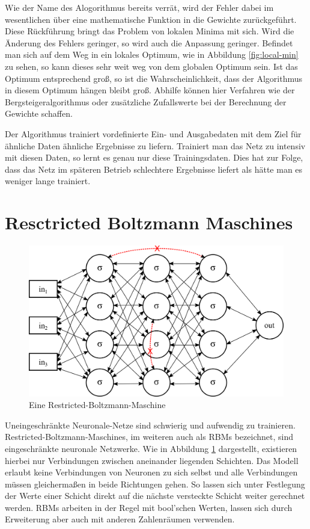 Wie der Name des Alogorithmus bereits verrät, wird der Fehler dabei im wesentlichen über eine mathematische Funktion in die Gewichte zurückgeführt. Diese Rückführung bringt das Problem von lokalen Minima mit sich. Wird die Änderung des Fehlers geringer, so wird auch die Anpassung geringer. Befindet man sich auf dem Weg in ein lokales Optimum, wie in Abbildung \ref{fig:local-min} zu sehen, so kann dieses sehr weit weg von dem globalen Optimum sein. Ist das Optimum entsprechend groß, so ist die Wahrscheinlichkeit, dass der Algorithmus in diesem Optimum hängen bleibt groß. Abhilfe können hier Verfahren wie der Bergsteigeralgorithmus oder zusätzliche Zufallswerte bei der Berechnung der Gewichte schaffen.

Der Algorithmus trainiert vordefinierte Ein- und Ausgabedaten mit dem Ziel für ähnliche Daten ähnliche Ergebnisse zu liefern. Trainiert man das Netz zu intensiv mit diesen Daten, so lernt es genau nur diese Trainingsdaten. Dies hat zur Folge, dass das Netz im späteren Betrieb schlechtere Ergebnisse liefert als hätte man es weniger lange trainiert.

\section{Resctricted Boltzmann Maschines}

\begin{figure}
	\centering
	\includegraphics[scale=1]{images/rbm.png}
	\caption{Eine Restricted-Boltzmann-Maschine}
	\label{fig:rbm}
\end{figure}

Uneingeschränkte Neuronale-Netze sind schwierig und aufwendig zu trainieren. Restricted-Boltzmann-Maschines, im weiteren auch als RBMs bezeichnet, sind eingeschränkte neuronale Netzwerke. Wie in Abbildung \ref{fig:rbm} dargestellt, existieren hierbei nur Verbindungen zwischen aneinander liegenden Schichten. Das Modell erlaubt keine Verbindungen von Neuronen zu sich selbst und alle Verbindungen müssen gleichermaßen in beide Richtungen gehen. So lassen sich unter Festlegung der Werte einer Schicht direkt auf die nächste versteckte Schicht weiter gerechnet werden. RBMs arbeiten in der Regel mit bool'schen Werten, lassen sich durch Erweiterung aber auch mit anderen Zahlenräumen verwenden.

